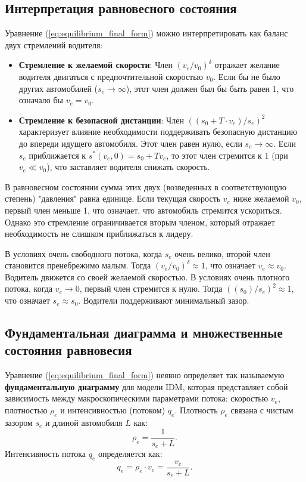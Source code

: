 \documentclass[12pt, a4paper]{article}
\begin{document}
\subsection{Интерпретация равновесного состояния}
\label{subsec:equilibrium_interpretation}

Уравнение (\ref{eq:equilibrium_final_form}) можно интерпретировать как баланс двух стремлений водителя:
\begin{itemize}
    \item \textbf{Стремление к желаемой скорости}: Член $\left(v_e/v_0\right)^\delta$ отражает желание водителя двигаться с предпочтительной скоростью $v_0$. Если бы не было других автомобилей ($s_e \to \infty$), этот член должен был бы быть равен 1, что означало бы $v_e = v_0$.
    \item \textbf{Стремление к безопасной дистанции}: Член $\left( (s_0 + T \cdot v_e) / s_e \right)^2$ характеризует влияние необходимости поддерживать безопасную дистанцию до впереди идущего автомобиля. Этот член равен нулю, если $s_e \to \infty$. Если $s_e$ приближается к $s^*(v_e, 0) = s_0 + T v_e$, то этот член стремится к 1 (при $v_e \ll v_0$), что заставляет водителя снижать скорость.
\end{itemize}
В равновесном состоянии сумма этих двух (возведенных в соответствующую степень) "давления" равна единице. Если текущая скорость $v_e$ ниже желаемой $v_0$, первый член меньше 1, что означает, что автомобиль стремится ускориться. Однако это стремление ограничивается вторым членом, который отражает необходимость не слишком приближаться к лидеру.

В условиях очень свободного потока, когда $s_e$ очень велико, второй член становится пренебрежимо малым. Тогда $(v_e/v_0)^\delta \approx 1$, что означает $v_e \approx v_0$. Водитель движется со своей желаемой скоростью.
В условиях очень плотного потока, когда $v_e \to 0$, первый член стремится к нулю. Тогда $((s_0)/s_e)^2 \approx 1$, что означает $s_e \approx s_0$. Водители поддерживают минимальный зазор.

\subsection{Фундаментальная диаграмма и множественные состояния равновесия}
\label{subsec:fundamental_diagram_equilibrium}

Уравнение (\ref{eq:equilibrium_final_form}) неявно определяет так называемую \textbf{фундаментальную диаграмму} для модели IDM, которая представляет собой зависимость между макроскопическими параметрами потока: скоростью $v_e$, плотностью $\rho_e$ и интенсивностью (потоком) $q_e$.
Плотность $\rho_e$ связана с чистым зазором $s_e$ и длиной автомобиля $L$ как:
\begin{equation}
\label{eq:density_equilibrium}
\rho_e = \frac{1}{s_e + L}.
\end{equation}
Интенсивность потока $q_e$ определяется как:
\begin{equation}
\label{eq:flow_equilibrium}
q_e = \rho_e \cdot v_e = \frac{v_e}{s_e + L}.
\end{equation}
\end{document}
